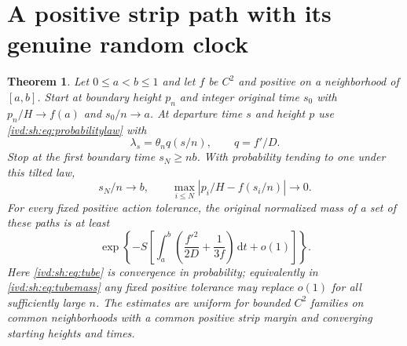\documentclass[11pt,letterpaper]{article}
\newtheorem{theorem}{Theorem}[section]
\theoremstyle{remark}\newtheorem{remark}[theorem]{Remark}
\numberwithin{equation}{section}
\newcommand{\dd}{\,\mathrm d}
\begin{document}
\section{A positive strip path with its genuine random clock}\label{ivd:sh:sec:tube}
\begin{theorem}\label{ivd:sh:thm:tube}
Let $0\le a<b\le1$ and let $f$ be $C^2$ and positive on a neighborhood
of $[a,b]$. Start at boundary height $p_n$ and integer original time
$s_0$ with $p_n/H\to f(a)$ and $s_0/n\to a$. At departure time $s$
and height $p$ use \eqref{ivd:sh:eq:probabilitylaw} with
\begin{equation}\label{ivd:sh:eq:control}
 \lambda_s=\theta_n q(s/n),\qquad q=f'/D.
\end{equation}
Stop at the first boundary time $s_N\ge nb$. With probability tending
to one under this tilted law,
\begin{equation}\label{ivd:sh:eq:tube}
 s_N/n\to b,\qquad
 \max_{i\le N}|p_i/H-f(s_i/n)|\to0.
\end{equation}
For every fixed positive action tolerance, the original normalized mass
of a set of these paths is at least
\begin{equation}\label{ivd:sh:eq:tubemass}
 \exp\left\{-S\left[
  \int_a^b\left(\frac{f'^2}{2D}+\frac1{3f}\right)\dd t+o(1)
 \right]\right\}.
\end{equation}
Here \eqref{ivd:sh:eq:tube} is convergence in probability; equivalently in
\eqref{ivd:sh:eq:tubemass} any fixed positive tolerance may replace $o(1)$
for all sufficiently large $n$. The estimates are uniform for bounded
$C^2$ families on common neighborhoods with a common positive strip
margin and converging starting heights and times.
\end{theorem}
\end{document}
